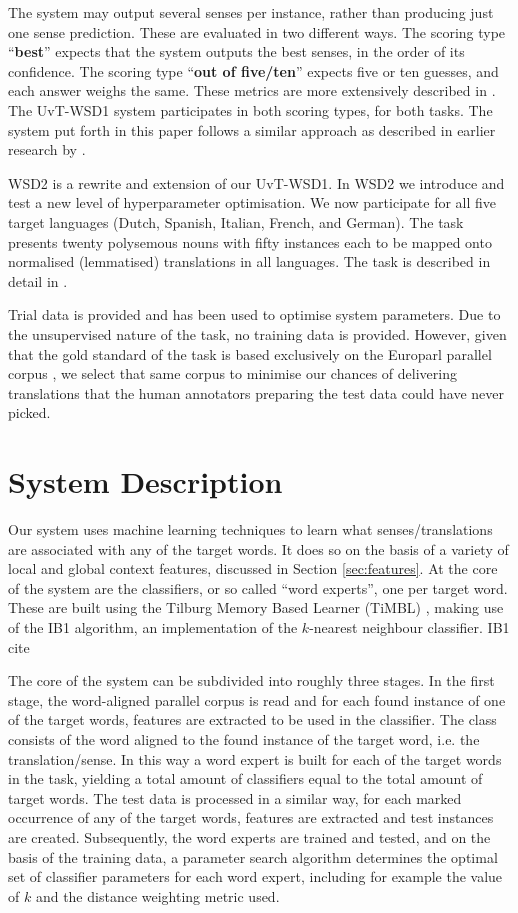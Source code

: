 The system may output several senses per instance, rather than producing just
one sense prediction. These are evaluated in two different ways. The scoring
type ``\textbf{best}'' expects that the system outputs the best senses, in the
order of its confidence. The scoring type ``\textbf{out of five/ten}'' expects
five or ten guesses, and each answer weighs the same. These metrics are more
extensively described in \citep{CLLS}. The UvT-WSD1 system participates in both
scoring types, for both tasks. The system put forth in this paper follows a
similar approach as described in earlier research by \citep{Hoste+02}.

WSD2 is a rewrite and extension of our UvT-WSD1. In WSD2 we introduce and test
a new level of hyperparameter optimisation. We now participate for all five
target languages (Dutch, Spanish, Italian, French, and German). The task
presents twenty polysemous nouns with fifty instances each to be mapped onto
normalised (lemmatised) translations in all languages. The task is described in
detail in \citep{CLWSD2013TASKPAPER}.

Trial data is provided and has been used to optimise system
parameters. Due to the unsupervised nature of the task, no training data is
provided. However, given that the gold standard of the task is based
exclusively on the Europarl parallel corpus \citep{EUROPARL}, we select that
same corpus to minimise our chances of delivering translations that the human
annotators preparing the test data could have never picked. 

\section{System Description}

Our system uses machine learning techniques to learn what
senses/translations are associated with any of the target words. It does so on
the basis of a variety of local and global context features, discussed in
Section \ref{sec:features}. At the core of the system are the classifiers, or
so called ``word experts'', one per target word. These are built using the
Tilburg Memory Based Learner (TiMBL) \citep{TIMBL}, making use of the IB1
algorithm, an implementation of the $k$-nearest neighbour classifier. %
IB1 cite

The core of the system can be subdivided into roughly three stages. In the
first stage, the word-aligned parallel corpus is read and for each found
instance of one of the target words, features are extracted to be used in the
classifier. The class consists of the word aligned to the found instance of the
target word, i.e. the translation/sense. In this way a word expert is built for
each of the target words in the task, yielding a total amount of classifiers
equal to the total amount of target words. The test data is processed in a
similar way, for each marked occurrence of any of the target words, features
are extracted and test instances are created. Subsequently, the word experts
are trained and tested, and on the basis of the training data, a parameter
search algorithm \citep{PARAMSEARCH} determines the optimal set of classifier
parameters for each word expert, including for example the value of $k$ and the
distance weighting metric used.

